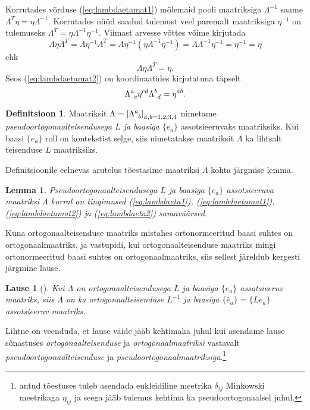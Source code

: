 \documentclass[12pt,a4paper,oneside]{article}
\theoremstyle{plain}
\newtheorem{lemma}{Lemma}[section]
\newtheorem{lause}{Lause}[section]
\theoremstyle{definition}
\newtheorem{definitsioon}{Definitsioon}[section]
\numberwithin{equation}{section}
\begin{document}
Korrutades võrduse (\ref{eq:lambdaetamat1}) mõlemaid pooli maatriksiga 
$\Lambda^{-1}$ saame $\Lambda^T \eta = \eta \Lambda^{-1}$. Korrutades 
nüüd saadud tulemust veel paremalt maatriksiga $\eta^{-1}$ on 
tulemuseks $\Lambda^T = \eta \Lambda^{-1} \eta^{-1}$. Viimast arvesse 
võttes võime kirjutada 
\[\Lambda \eta \Lambda^T = \Lambda \eta^{-1} 
\Lambda^T = \Lambda \eta^{-1} \left( \eta \Lambda^{-1} \eta^{-1} 
\right) = \Lambda \Lambda^{-1} \eta^{-1} = \eta^{-1} = \eta\] 
ehk
\begin{equation} \label{eq:lambdaetamat2}
\Lambda \eta \Lambda^T = \eta.
\end{equation}
Seos (\ref{eq:lambdaetamat2}) on koordinaatides kirjutatuna täpselt
\begin{equation} \label{eq:lambdaeta2}
\Lambda\indices{^a_c} \eta^{cd} \Lambda\indices{^b_d} = \eta^{ab}.
\end{equation}

\begin{definitsioon}
Maatriksit $\Lambda = \left[\Lambda\indices{^a_b} 
\right]_{a,b=1,2,3,4}$ nimetame \emph{pseudoortogonaalteisendusega 
$L$ ja baasiga $\{e_a\}$} assotsieeruvaks maatriksiks. Kui baasi 
$\{e_a\}$ roll on kontekstist selge, siis nimetatakse maatriksit 
$\Lambda$ ka lihtsalt teisenduse $L$ maatriksiks.
\end{definitsioon}

Definitsioonile eelnevas arutelus tõestasime maatriksi $\Lambda$ 
kohta järgmise lemma.
\begin{lemma} \label{lemma:lambdainvariant}
Pseudoortogonaalteisendusega $L$ ja baasiga $\{e_a\}$ assotsieeruva 
maatriksi $\Lambda$ korral on tingimused (\ref{eq:lambdaeta1}), 
(\ref{eq:lambdaetamat1}), (\ref{eq:lambdaetamat2}) ja (\ref{eq:lambdaeta2}) 
samaväärsed.
\end{lemma}

Kuna ortogonaalteisenduse maatriks mistahes ortonormeeritud baasi 
suhtes on ortogonaalmaatriks, ja vastupidi, kui ortogonaalteisenduse 
maatriks mingi ortonormeeritud baasi suhtes on ortogonaalmaatriks, 
siis sellest järeldub kergesti järgmine lause.

\begin{lause}[\textnormal{\cite[lk 271]{Kilp}}]
Kui $\Lambda$ on ortogonaalteisendusega $L$ ja baasiga $\{e_a\}$ 
assotsieeruv maatriks, siis $\Lambda$ on ka ortogonaalteisenduse 
$L^{-1}$ ja baasiga $\{\hat{e}_a\} = \{Le_a\}$ assotsieeruv maatriks.
\end{lause}

Lihtne on veenduda, et lause väide jääb kehtimaka juhul kui asendame 
lause sõnastuses \emph{ortogonaalteisenduse} ja 
\emph{ortogonaalmaatriksi} vastavalt \emph{pseudoortogonaalteisenduse} 
ja \emph{pseudoortogonaalmaatriksiga}.\footnote{\cite{Kilp} antud 
tõestuses tuleb asendada eukleidiline meetrika $\delta_{ij}$ 
Minkowski meetrikaga $\eta_{ij}$ ja seega jääb tulemus kehtima 
ka pseudoortogonaalsel juhul.}
\end{document}
